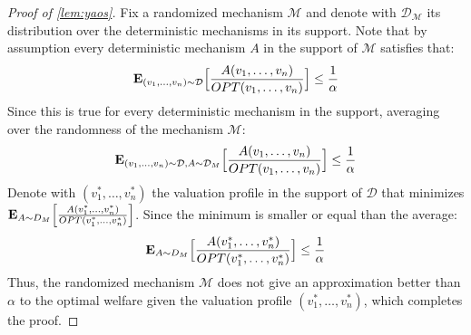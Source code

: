 \begin{proof}[Proof of \cref{lem:yaos}] 
Fix a randomized mechanism $\mathcal M$ and 
denote with $\mathcal{D}_{\mathcal{M}}$ its distribution over the deterministic mechanisms in its support.
Note that by assumption every deterministic mechanism $A$ in the support of $\mathcal M$ satisfies that:
$$
    \mbox{\bf E}_{(v_1,\ldots,v_n)\sim {\mathcal{D}}}\Big[\dfrac{A(v_1,\ldots,v_n)}{OPT(v_1,\ldots,v_n)}\Big]\le 
    \frac{1}{\alpha}
$$
Since this is true for every deterministic mechanism in the support, averaging over the randomness of the mechanism $\mathcal M$:
$$
   \mbox{\bf E}_{(v_1,\ldots,v_n)\sim \mathcal{D},A\sim \mathcal {D}_M}\Big[\dfrac{A(v_1,\ldots,v_n)}{OPT(v_1,\ldots,v_n)}\Big]\le \frac{1}{\alpha} 
$$
Denote with $(v_1^\ast,\ldots,v_n^\ast)$ the valuation profile in the support of $\mathcal D$ that minimizes $\mbox{\bf E}_{A\sim \mathcal \mathcal D_M}\Big[\frac{A(v_1^\ast,\ldots,v_n^\ast)}{OPT(v_1^\ast,\ldots,v_n^\ast)}\Big]$. Since the minimum is  smaller or equal than the average:
$$
   \mbox{\bf E}_{A\sim \mathcal \mathcal D_M}\Big[\dfrac{A(v_1^\ast,\ldots,v_n^\ast)}{OPT(v_1^\ast,\ldots,v_n^\ast)}\Big]\le  \frac{1}{\alpha}
$$
Thus, the randomized mechanism $\mathcal M$ does not give an  approximation better than $\alpha$ to the optimal welfare given the valuation profile $(v_1^\ast,\ldots,v_n^\ast)$, which completes the proof.
\end{proof}




